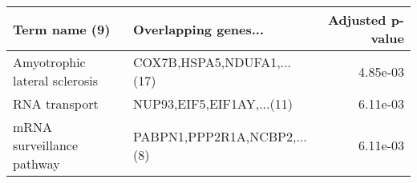 \begin{tabular}{llr}
\toprule
                Term name (9) &        Overlapping genes... &  Adjusted p-value \\
\midrule
Amyotrophic lateral sclerosis &  COX7B,HSPA5,NDUFA1,...(17) &          4.85e-03 \\
                RNA transport &   NUP93,EIF5,EIF1AY,...(11) &          6.11e-03 \\
    mRNA surveillance pathway & PABPN1,PPP2R1A,NCBP2,...(8) &          6.11e-03 \\
\bottomrule
\end{tabular}
